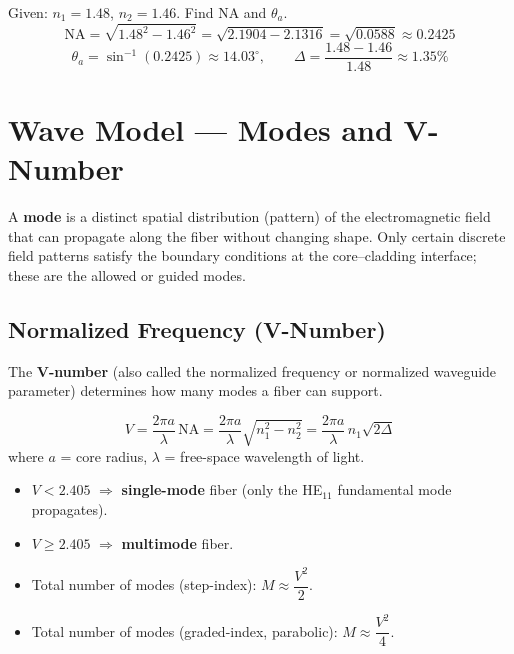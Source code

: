 \documentclass[12pt,a4paper]{article}
\begin{document}
\begin{tcolorbox}[examplebox, title={\textbf{Worked Example: Calculate NA and Acceptance Angle}}]
Given: $n_1 = 1.48$, $n_2 = 1.46$. Find NA and $\theta_a$.
\[
\text{NA} = \sqrt{1.48^2 - 1.46^2} = \sqrt{2.1904 - 2.1316} = \sqrt{0.0588} \approx 0.2425
\]
\[
\theta_a = \sin^{-1}(0.2425) \approx 14.03^\circ, \qquad \Delta = \frac{1.48 - 1.46}{1.48} \approx 1.35\%
\]
\end{tcolorbox}

\section{Wave Model --- Modes and V-Number}

\begin{tcolorbox}[defbox, title={\textbf{Modes in an Optical Fiber}}]
A \textbf{mode} is a distinct spatial distribution (pattern) of the electromagnetic field that can propagate along the fiber without changing shape. Only certain discrete field patterns satisfy the boundary conditions at the core--cladding interface; these are the allowed or guided modes.
\end{tcolorbox}

\subsection{Normalized Frequency (V-Number)}
The \textbf{V-number} (also called the normalized frequency or normalized waveguide parameter) determines how many modes a fiber can support.

\begin{tcolorbox}[formulabox, title={\textbf{V-Number Formula}}]
\[
V = \frac{2\pi a}{\lambda}\,\text{NA} = \frac{2\pi a}{\lambda}\sqrt{n_1^2 - n_2^2} = \frac{2\pi a}{\lambda}\,n_1\sqrt{2\Delta}
\]
where $a$ = core radius, $\lambda$ = free-space wavelength of light.
\begin{itemize}[leftmargin=*, itemsep=2pt, topsep=4pt]
  \item $V < 2.405$ $\Rightarrow$ \textbf{single-mode} fiber (only the HE$_{11}$ fundamental mode propagates).
  \item $V \geq 2.405$ $\Rightarrow$ \textbf{multimode} fiber.
  \item Total number of modes (step-index): $M \approx \dfrac{V^2}{2}$.
  \item Total number of modes (graded-index, parabolic): $M \approx \dfrac{V^2}{4}$.
\end{itemize}
\end{tcolorbox}
\end{document}
